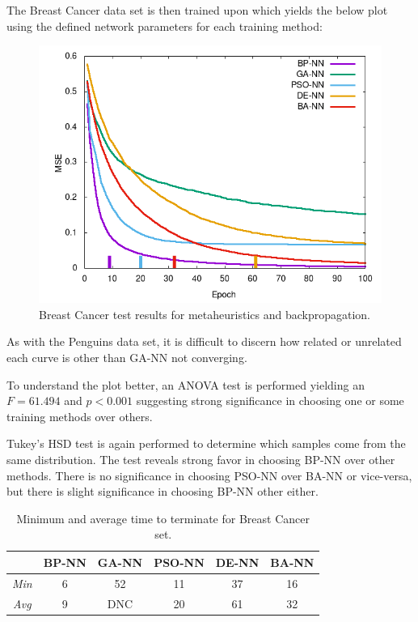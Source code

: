 \documentclass[a4paper,12pt]{article}
\begin{document}
The Breast Cancer data set is then trained upon which yields the below plot using the defined network parameters for each training method:

\begin{figure}[h!]
\centering
\includegraphics[scale=0.65]{images/breast-plot.png}
\caption{Breast Cancer test results for metaheuristics and backpropagation.}
\label{fig:breast}
\end{figure}

As with the Penguins data set, it is difficult to discern how related or unrelated each curve is other than GA-NN not converging.

To understand the plot better, an ANOVA test is performed yielding an $F=61.494$ and $p < 0.001$ suggesting strong significance in choosing one or some training methods over others.

Tukey's HSD test is again performed to determine which samples come from the same distribution. The test reveals strong favor in choosing BP-NN over other methods. There is no significance in choosing PSO-NN over BA-NN or vice-versa, but there is slight significance in choosing BP-NN other either.

\begin{table}[h!]
\centering
\begin{tabular}{c|c|c|c|c|c|}
\cline{2-6}
 & \textbf{BP-NN} & \textbf{GA-NN} & \textbf{PSO-NN} & \textbf{DE-NN} & \textbf{BA-NN} \\ \hline
\multicolumn{1}{|c|}{\textit{Min}} & \cellcolor[HTML]{C5F1BF}6 & \cellcolor[HTML]{FFCCC9}52 & 11 & 37 & 16 \\ \hline
\multicolumn{1}{|c|}{\textit{Avg}} & \cellcolor[HTML]{C5F1BF}9 & \cellcolor[HTML]{FFCCC9}DNC & 20 & 61 & 32 \\ \hline
\end{tabular}
\caption{Minimum and average time to terminate for Breast Cancer set.}
\label{Tab:breast-min}
\end{table}
\end{document}
